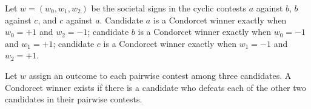 \begin{definition}
\label{FABL.IsCondorcetWinner}
\leanok
{}
Let $w=(w_0,w_1,w_2)$ be the societal signs in the cyclic contests $a$ against $b$, $b$
against $c$, and $c$ against $a$. Candidate $a$ is a Condorcet winner exactly when
$w_0=+1$ and $w_2=-1$; candidate $b$ is a Condorcet winner exactly when $w_0=-1$ and
$w_1=+1$; candidate $c$ is a Condorcet winner exactly when $w_1=-1$ and $w_2=+1$.
\end{definition}

\begin{definition}
\label{FABL.HasCondorcetWinner}
\leanok
{}
Let $w$ assign an outcome to each pairwise contest among three candidates. A Condorcet
winner exists if there is a candidate who defeats each of the other two candidates in
their pairwise contests.
\end{definition}

